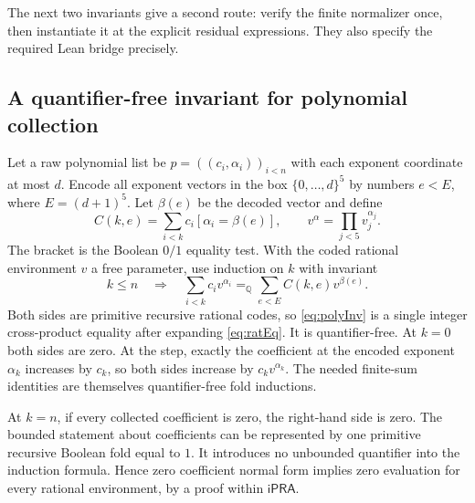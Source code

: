 \documentclass[11pt,a4paper]{article}
\numberwithin{equation}{section}
\theoremstyle{definition}\newtheorem{definition}[theorem]{Definition}
\theoremstyle{remark}\newtheorem{remark}[theorem]{Remark}
\newcommand{\ipra}{\mathsf{iPRA}}
\newcommand{\Q}{\mathbb{Q}}\newcommand{\Z}{\mathbb{Z}}\newcommand{\N}{\mathbb{N}}
\begin{document}
The next two invariants give a second route: verify the finite normalizer once, then instantiate it at the explicit residual expressions. They also specify the required Lean bridge precisely.

\subsection{A quantifier-free invariant for polynomial collection}
Let a raw polynomial list be $p=((c_i,\alpha_i))_{i<n}$ with each exponent coordinate at most $d$. Encode all exponent vectors in the box $\{0,\ldots,d\}^5$ by numbers $e<E$, where $E=(d+1)^5$. Let $\beta(e)$ be the decoded vector and define
\[
 C(k,e)=\sum_{i<k}c_i[\alpha_i=\beta(e)],\qquad
 v^\alpha=\prod_{j<5}v_j^{\alpha_j}.
\]
The bracket is the Boolean $0/1$ equality test. With the coded rational environment $v$ a free parameter, use induction on $k$ with invariant
\begin{equation}\label{eq:polyInv}
 k\le n\quad\Longrightarrow\quad
 \sum_{i<k}c_i v^{\alpha_i}
 =_\Q\sum_{e<E}C(k,e)v^{\beta(e)}.
\end{equation}
Both sides are primitive recursive rational codes, so \eqref{eq:polyInv} is a single integer cross-product equality after expanding \eqref{eq:ratEq}. It is quantifier-free. At $k=0$ both sides are zero. At the step, exactly the coefficient at the encoded exponent $\alpha_k$ increases by $c_k$, so both sides increase by $c_kv^{\alpha_k}$. The needed finite-sum identities are themselves quantifier-free fold inductions.

At $k=n$, if every collected coefficient is zero, the right-hand side is zero. The bounded statement about coefficients can be represented by one primitive recursive Boolean fold equal to $1$. It introduces no unbounded quantifier into the induction formula. Hence zero coefficient normal form implies zero evaluation for every rational environment, by a proof within $\ipra$.
\end{document}
